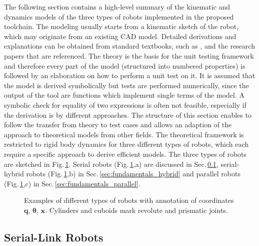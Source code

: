 \documentclass[runningheads]{llncs}
\begin{document}
The following section contains a high-level summary of the kinematic and dynamics models of the three types of robots implemented in the proposed toolchain.
The modeling usually starts from a kinematic sketch of the robot, which may originate from an existing CAD model.
Detailed derivations and explanations can be obtained from standard textbooks, such as \cite{Merlet2006,KhalilDom2002,BriotKha2015,SaminFis2003}, and the research papers that are referenced.
The theory is the basis for the unit testing framework and therefore every part of the model (structured into numbered properties) is followed by an elaboration on how to perform a unit test on it.
It is assumed that the model is derived symbolically but tests are performed numerically, since the output of the tool are functions which implement single terms of the model.
A symbolic check for equality of two expressions is often not feasible, especially if the derivation is by different approaches.
The structure of this section enables to follow the transfer from theory to test cases and allows an adaption of the approach to theoretical models from other fields.
The theoretical framework is restricted to rigid body dynamics for three different types of robots, which each require a specific approach to derive efficient models.
The three types of robots are sketched in Fig.\,\ref{fig:robot_examples}.
Serial robots (Fig.\,\ref{fig:robot_examples},a) are discussed in Sec.\,\ref{sec:fundamentals_serial}, serial-hybrid robots (Fig.\,\ref{fig:robot_examples},b) in Sec.\,\ref{sec:fundamentals_hybrid} and parallel robots (Fig.\,\ref{fig:robot_examples},c) in Sec.\,\ref{sec:fundamentals_parallel}.

\begin{figure}[tb]

\caption{Examples of different types of robots with annotation of coordinates $\bm{q}$, $\bm{\theta}$,  $\bm{x}$. Cylinders and cuboids mark revolute and prismatic joints.} %
\label{fig:robot_examples}
\end{figure} 

\subsection{Serial-Link Robots}
\label{sec:fundamentals_serial}
\end{document}

